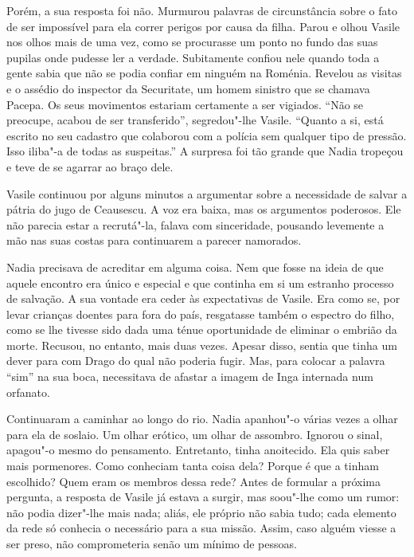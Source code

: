 Porém, a sua resposta foi não. Murmurou palavras de circunstância sobre
o fato de ser impossível para ela correr perigos por causa da filha.
Parou e olhou Vasile nos olhos mais de uma vez, como se procurasse um
ponto no fundo das suas pupilas onde pudesse ler a verdade. Subitamente confiou nele quando toda a gente sabia que não se podia confiar
em ninguém na Roménia. Revelou as visitas e o assédio do inspector da
Securitate, um homem sinistro que se chamava Pacepa. Os seus movimentos
estariam certamente a ser vigiados. ``Não se preocupe, acabou de ser
transferido'', segredou"-lhe Vasile. ``Quanto a si, está escrito no seu
cadastro que colaborou com a polícia sem qualquer tipo de pressão. Isso
iliba"-a de todas as suspeitas.'' A surpresa foi tão grande que Nadia
tropeçou e teve de se agarrar ao braço dele.

Vasile continuou por alguns minutos a argumentar
sobre a necessidade de salvar a pátria do jugo de Ceausescu. A voz era
baixa, mas os argumentos poderosos. Ele não parecia estar a recrutá"-la,
falava com sinceridade, pousando levemente a mão nas suas costas para
continuarem a parecer namorados.

Nadia precisava de acreditar em alguma coisa. Nem que fosse na ideia de
que aquele encontro era único e especial e que continha em si um
estranho processo de salvação. A sua vontade era ceder às expectativas
de Vasile. Era como se, por levar crianças doentes para fora do país,
resgatasse também o espectro do filho, como se lhe tivesse sido dada uma
ténue oportunidade de eliminar o embrião da morte. Recusou, no entanto,
mais duas vezes. Apesar disso, sentia que tinha um dever para com Drago
do qual
não poderia fugir. Mas, para colocar a palavra ``sim'' na sua boca,
necessitava de afastar a imagem de Inga internada num orfanato.

Continuaram a caminhar ao longo do rio. Nadia apanhou"-o várias vezes a
olhar para ela de soslaio. Um olhar erótico, um olhar de assombro.
Ignorou o sinal, apagou"-o mesmo do pensamento. Entretanto, tinha
anoitecido. Ela quis saber mais pormenores. Como conheciam tanta coisa
dela? Porque é que a tinham escolhido? Quem eram os membros dessa rede?
Antes de formular a próxima pergunta, a resposta de Vasile já estava a
surgir, mas soou"-lhe como um rumor: não podia dizer"-lhe mais nada;
aliás, ele próprio não sabia tudo; cada elemento da rede só conhecia o
necessário para a sua missão. Assim, caso alguém viesse a ser preso, não
comprometeria senão um mínimo de pessoas.

